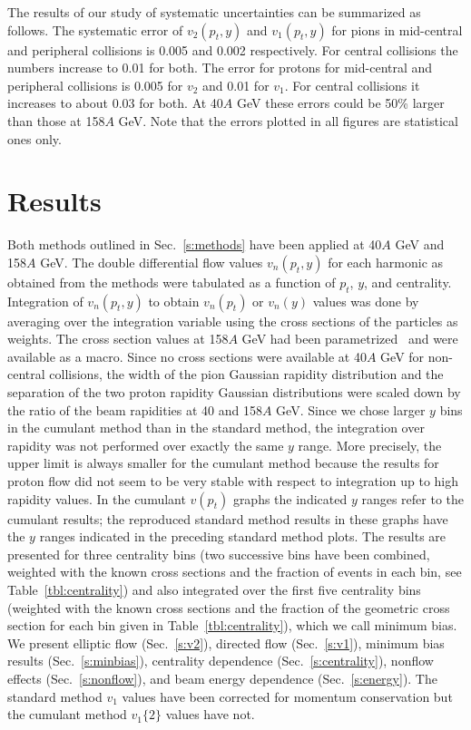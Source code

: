\documentclass[aps,prc,superscriptaddress,showpacs,floatfix,nofootinbib]{revtex4}
\begin{document}
The results of our study of systematic uncertainties can be summarized
as follows. The systematic error of $v_2(p_t,y)$ and $v_1(p_t,y)$ for
pions in mid-central and peripheral collisions is 0.005 and 0.002
respectively. For central collisions the numbers increase to 0.01 for
both. The error for protons for mid-central and peripheral collisions
is 0.005 for $v_2$ and 0.01 for $v_1$. For central collisions it
increases to about 0.03 for both. At 40$A$ GeV these errors
could be 50\% larger than those at 158$A$ GeV. Note that the errors 
plotted in all figures are statistical ones only.


\section{Results}
\label{s:results}

Both methods outlined in Sec.~\ref{s:methods} have been applied at
40$A$ GeV and 158$A$ GeV.  The double differential flow values
$v_n(p_t,y)$ for each harmonic as obtained from the methods were
tabulated as a function of $p_t$, $y$, and centrality. Integration of
$v_n(p_t,y)$ to obtain $v_n(p_t)$ or $v_n(y)$ values was done by
averaging over the integration variable using the cross sections of
the particles as weights. The cross section values at 158$A$ GeV had
been parametrized~\cite{crosssections} and were available as a
macro. Since no cross sections were available at 40$A$ GeV for
non-central collisions, the width of the pion Gaussian rapidity
distribution and the separation of the two proton rapidity Gaussian
distributions were scaled down by the ratio of the beam rapidities at
40 and 158$A$ GeV. Since we chose larger $y$ bins in the cumulant
method than in the standard method, the integration over rapidity was
not performed over exactly the same $y$ range.  More precisely, the
upper limit is always smaller for the cumulant method because the
results for proton flow did not seem to be very stable with respect to
integration up to high rapidity values. In the cumulant $v(p_t)$
graphs the indicated $y$ ranges refer to the cumulant results; the
reproduced standard method results in these graphs have the $y$ ranges
indicated in the preceding standard method plots. The results are
presented for three centrality bins (two successive bins have been
combined, weighted with the known cross sections and the fraction of
events in each bin, see Table~\ref{tbl:centrality}) and also
integrated over the first five centrality bins (weighted with the
known cross sections and the fraction of the geometric cross section
for each bin given in Table~\ref{tbl:centrality}), which we call
minimum bias. We present elliptic flow (Sec.~\ref{s:v2}), directed
flow (Sec.~\ref{s:v1}), minimum bias results (Sec.~\ref{s:minbias}),
centrality dependence (Sec.~\ref{s:centrality}), nonflow effects
(Sec.~\ref{s:nonflow}), and beam energy dependence
(Sec.~\ref{s:energy}).  The standard method $v_1$ values have been
corrected for momentum conservation but the cumulant method $v_1\{2\}$
values have not.
\end{document}
